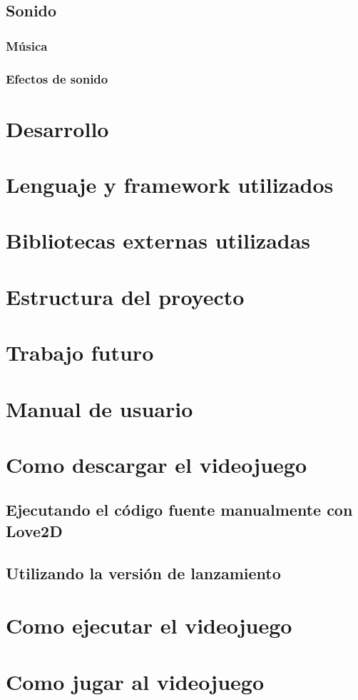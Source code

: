 \documentclass[12pt, spanish]{article}
\begin{document}
\subsection{Sonido}

\subsubsection{Música}

\subsubsection{Efectos de sonido}

\section*{Desarrollo}
\label{sec:desarrollo}

\section{Lenguaje y framework utilizados}

\section{Bibliotecas externas utilizadas}

\section{Estructura del proyecto}


\section*{Trabajo futuro}
\label{sec:futuro}


\section*{Manual de usuario}
\label{sec:manual}

\section{Como descargar el videojuego}

\subsection{Ejecutando el código fuente manualmente con Love2D}

\subsection{Utilizando la versión de lanzamiento}


\section{Como ejecutar el videojuego}

\section{Como jugar al videojuego}
\end{document}
